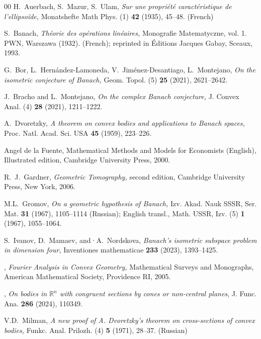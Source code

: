 \documentclass[amsfonts,reqno,11pt]{amsart}
\newcommand{\Rn}{\mathbb{R}^n}
\begin{document}
\begin{thebibliography}{00}
 {\sc H.~Auerbach, S.~Mazur, S.~Ulam}, {\it Sur une propri\'et\'e caract\'eristique de l’ellipsoïde,} Monatshefte Math Phys. (1) {\bf 42} (1935), 45--48. (French)

 {\sc S.~Banach}, {\it Th\'eorie des op\'erations lin\'eaires,} Monografie Matematyczne, vol. 1. PWN, Warszawa
(1932). (French); reprinted in \'Editions Jacques Gabay, Sceaux, 1993.

 {\sc G.~Bor, L.~Hern\'andez-Lamoneda, V.~Jim\'enez-Desantiago, L.~Montejano}, {\it On the isometric conjecture
of Banach,} Geom. Topol. (5) {\bf 25} (2021), 2621--2642.

 {\sc J.~Bracho and L.~Montejano}, {\it On the complex Banach conjecture,} J. Convex Anal. (4) {\bf 28} (2021), 1211--1222.

 {\sc A.~Dvoretzky}, {\it A theorem on convex bodies and applications to Banach spaces,} Proc. Natl. Acad. Sci. USA {\bf 45} (1959), 223--226.

 {\sc Angel de la Fuente}, Mathematical Methods and Models for Economists (English), Illustrated edition, Cambridge University Press, 2000.


 {\sc R.~J.~Gardner}, {\em Geometric Tomography,} second edition, Cambridge University Press, New York, 2006.

 {\sc M.L.~Gromov}, {\it On a geometric hypothesis of Banach,} Izv. Akad. Nauk SSSR, Ser. Mat. {\bf 31} (1967), 1105--1114 (Russian); English transl., Math. USSR, Izv. (5) {\bf 1} (1967), 1055--1064.

 {\sc S.~Ivanov, D.~Mamaev, and·A.~Nordskova}, {\it Banach’s isometric subspace problem in dimension four,} Inventiones mathematicae {\bf 233} (2023), 1393--1425.

, {\em Fourier Analysis in Convex Geometry,}  Mathematical Surveys and Monographs, American Mathematical
Society, Providence RI, 2005.

, {\it On bodies in $\Rn$ with congruent sections by cones or non-central planes}, J. Func. Ana. {\bf 286} (2024), 110349.

 {\sc V.D.~Milman}, {\it A new proof of A. Dvoretzky’s theorem on cross-sections of convex bodies,} Funkc.
Anal. Prilozh. (4) {\bf 5} (1971), 28--37. (Russian)


\end{thebibliography}
\end{document}
